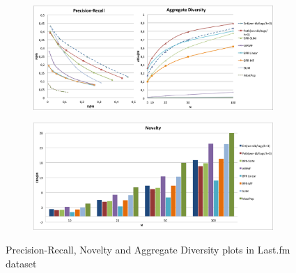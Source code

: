 \begin{figure}
	\centering
	\begin{subfigure}[b]{1\textwidth}
		\includegraphics[width=\textwidth]{ch07_graph-rec_pics/pr_adiv_lf.png}
	\end{subfigure}
	\begin{subfigure}[b]{1\textwidth}
		\includegraphics[width=\textwidth]{ch07_graph-rec_pics/nov_lf.png}
	\end{subfigure}
	\caption{Precision-Recall, Novelty and Aggregate Diversity plots in Last.fm dataset\label{fig:graph-rec:accur_sf}}
\end{figure}

